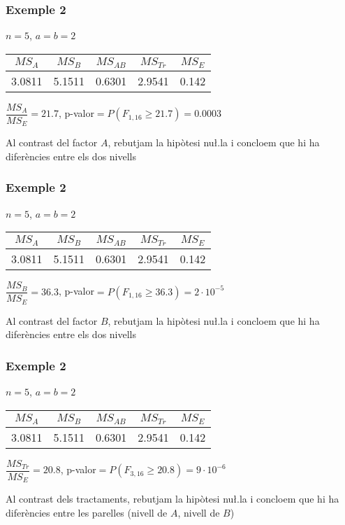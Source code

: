 \documentclass[12pt,t]{beamer}
\renewcommand{\geq}{\geqslant}
\theoremstyle{plain}
\theoremstyle{definition}
\begin{document}
\begin{frame}
\frametitle{Exemple 2}
$n=5$, $a=b=2$
\medskip

\begin{center}
\begin{tabular}{ccccc}
$MS_A$ & $MS_B$ & $MS_{AB}$ & $MS_{Tr}$ & $MS_E$\\ \hline
3.0811  &  5.1511 & 0.6301 & 2.9541 & 0.142
\end{tabular}
\end{center}
\medskip

$\dfrac{MS_{A}}{MS_E}=21.7$, p-valor$=P(F_{1,16}\geq 21.7)=0.0003$
\bigskip

Al contrast del factor $A$, rebutjam la hipòtesi nu\l.la i concloem que hi ha diferències entre els dos nivells


\end{frame}
\begin{frame}
\frametitle{Exemple 2}
$n=5$, $a=b=2$
\medskip

\begin{center}
\begin{tabular}{ccccc}
$MS_A$ & $MS_B$ & $MS_{AB}$ & $MS_{Tr}$ & $MS_E$\\ \hline
3.0811  &  5.1511 & 0.6301 & 2.9541 & 0.142
\end{tabular}
\end{center}
\medskip

$\dfrac{MS_{B}}{MS_E}=36.3$, p-valor$=P(F_{1,16}\geq 36.3)=2\cdot 10^{-5}$
\bigskip


Al contrast del factor $B$, rebutjam la hipòtesi nu\l.la i concloem que hi ha diferències entre els dos nivells

\end{frame}
\begin{frame}
\frametitle{Exemple 2}
$n=5$, $a=b=2$
\medskip

\begin{center}
\begin{tabular}{ccccc}
$MS_A$ & $MS_B$ & $MS_{AB}$ & $MS_{Tr}$ & $MS_E$\\ \hline
3.0811  &  5.1511 & 0.6301 & 2.9541 & 0.142
\end{tabular}
\end{center}
\bigskip

$\dfrac{MS_{Tr}}{MS_E}=20.8$, p-valor$=P(F_{3,16}\geq 20.8)=9\cdot 10^{-6}$
\medskip


Al contrast dels tractaments, rebutjam la hipòtesi nu\l.la i concloem que hi ha diferències entre les parelles (nivell de $A$, nivell de $B$)

\end{frame}
\end{document}
